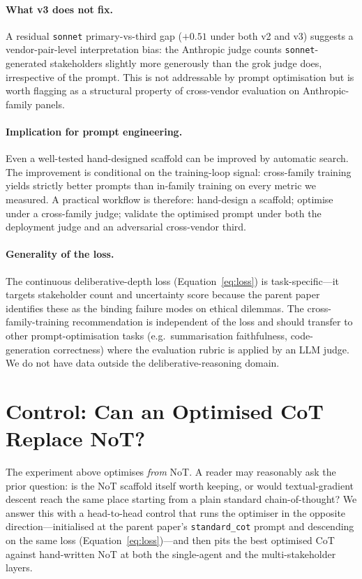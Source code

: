 \documentclass[11pt]{article}
\begin{document}
\paragraph{What v3 does not fix.}
A residual \texttt{sonnet} primary-vs-third gap ($+0.51$ under both v2 and v3) suggests a vendor-pair-level interpretation bias: the Anthropic judge counts \texttt{sonnet}-generated stakeholders slightly more generously than the grok judge does, irrespective of the prompt.
This is not addressable by prompt optimisation but is worth flagging as a structural property of cross-vendor evaluation on Anthropic-family panels.

\paragraph{Implication for prompt engineering.}
Even a well-tested hand-designed scaffold can be improved by automatic search.
The improvement is conditional on the training-loop signal: cross-family training yields strictly better prompts than in-family training on every metric we measured.
A practical workflow is therefore: hand-design a scaffold; optimise under a cross-family judge; validate the optimised prompt under both the deployment judge and an adversarial cross-vendor third.

\paragraph{Generality of the loss.}
The continuous deliberative-depth loss (Equation~\ref{eq:loss}) is task-specific---it targets stakeholder count and uncertainty score because the parent paper identifies these as the binding failure modes on ethical dilemmas.
The cross-family-training recommendation is independent of the loss and should transfer to other prompt-optimisation tasks (e.g.\ summarisation faithfulness, code-generation correctness) where the evaluation rubric is applied by an LLM judge.
We do not have data outside the deliberative-reasoning domain.

\section{Control: Can an Optimised CoT Replace NoT?}
\label{sec:cot_control}

The experiment above optimises \emph{from} NoT.
A reader may reasonably ask the prior question: is the NoT scaffold itself worth keeping, or would textual-gradient descent reach the same place starting from a plain standard chain-of-thought?
We answer this with a head-to-head control that runs the optimiser in the opposite direction---initialised at the parent paper's \texttt{standard\_cot} prompt and descending on the same loss (Equation~\ref{eq:loss})---and then pits the best optimised CoT against hand-written NoT at both the single-agent and the multi-stakeholder layers.
\end{document}
